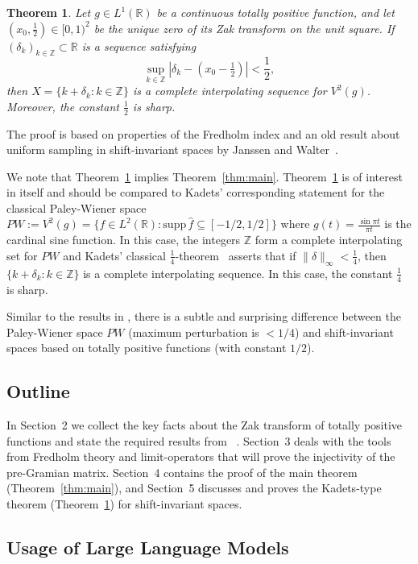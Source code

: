 \documentclass[reqno,a4paper,12pt]{amsart}
\numberwithin{equation}{section}
\newtheorem{theorem}[definition]{Theorem}
\def\Z{{\mathbb Z}}
\def\R{{\mathbb R}}
\newcommand\1{\mathds{1}}
\begin{document}
\begin{theorem}\label{thm:kadets}
Let $g\in L^1(\mathbb R)$ be a continuous totally positive function, and let $(x_0,\frac12)\in[0,1)^2$ be the unique zero of its Zak
transform on the unit square. If $(\delta_k)_{k\in\mathbb Z} \subset \R$ is a sequence satisfying
$$
   \sup _{k\in \Z} |\delta_k -(x_0-\tfrac{1}{2})| <\frac12, 
$$
then $X = \{ k+\delta_k : k \in \Z \}$ is a complete interpolating
sequence for $V^2(g)$. Moreover, the constant $\frac12$ is sharp. %
\end{theorem}
The  proof is based on properties of the Fredholm index and an old
result about uniform sampling in shift-invariant spaces by Janssen and
Walter~\cite{janssen94a,walter94}.

We note that Theorem~\ref{thm:kadets} implies
Theorem~\ref{thm:main}. 
Theorem~\ref{thm:kadets} is of interest in itself and  should be
compared to Kadets'  corresponding
statement for  the classical Paley-Wiener space $PW := V^2(g) = \{f\in
L^2(\R): \mathrm{supp} \, \hat{f} \subseteq [-1/2,1/2]\}$ where $g(t)
= \frac{\sin \pi t}{\pi t}$ is the cardinal sine function. In this
case, the integers $\Z $ form a complete interpolating set for $PW$ and
Kadets' classical $\frac14$-theorem~\cite{Kadec1964} asserts that if $\|\delta\|_\infty<\frac14$, then  $\{k+\delta _k: k\in \Z\} $ is
a complete interpolating sequence.
In this case,  the constant $\frac14$ is sharp.

Similar to the results in  \cite{BBG22}, there is a subtle and surprising  difference between the
Paley-Wiener space $PW$ (maximum perturbation  is $<1/4$) and
shift-invariant spaces based on totally positive functions (with
constant $1/2$). 

\subsection{Outline} In Section~2 we collect the key facts about the
Zak transform of totally positive functions and state the required
results from ~\cite{Groechenig2023}. Section~3 deals with the tools
from Fredholm theory and limit-operators that will prove the
injectivity of the pre-Gramian matrix. Section~4 contains the proof of
the main theorem (Theorem~\ref{thm:main}), and Section~5 discusses and
proves the Kadets-type theorem (Theorem~\ref{thm:kadets}) for
shift-invariant spaces.  

\subsection*{Usage of Large Language Models}
\end{document}
